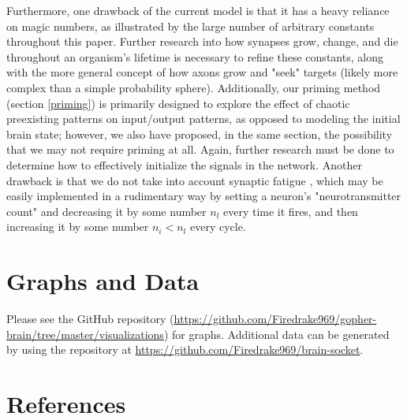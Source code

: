 \documentclass[12pt]{article}
\begin{document}
Furthermore, one drawback of the current model is that it has a heavy reliance on magic numbers, as illustrated by the large number of arbitrary constants throughout this paper.  Further research into how synapses grow, change, and die throughout an organism's lifetime is necessary to refine these constants, along with the more general concept of how axons grow and "seek" targets (likely more complex than a simple probability sphere).  Additionally, our priming method (section \ref{priming}) is primarily designed to explore the effect of chaotic preexisting patterns on input/output patterns, as opposed to modeling the initial brain state; however, we also have proposed, in the same section, the possibility that we may not require priming at all.  Again, further research must be done to determine how to effectively initialize the signals in the network.  Another drawback is that we do not take into account synaptic fatigue \cite{synapticfatigue}, which may be easily implemented in a rudimentary way by setting a neuron's "neurotransmitter count" and decreasing it by some number $n_l$ every time it fires, and then increasing it by some number $n_i < n_l$ every cycle.


\newpage

\section{Graphs and Data} \label{graphs}

Please see the GitHub repository (\url{https://github.com/Firedrake969/gopher-brain/tree/master/visualizations}) for graphs.  Additional data can be generated by using the repository at \url{https://github.com/Firedrake969/brain-socket}.


\newpage

\section{References}

\printbibliography[heading=none]
\end{document}
